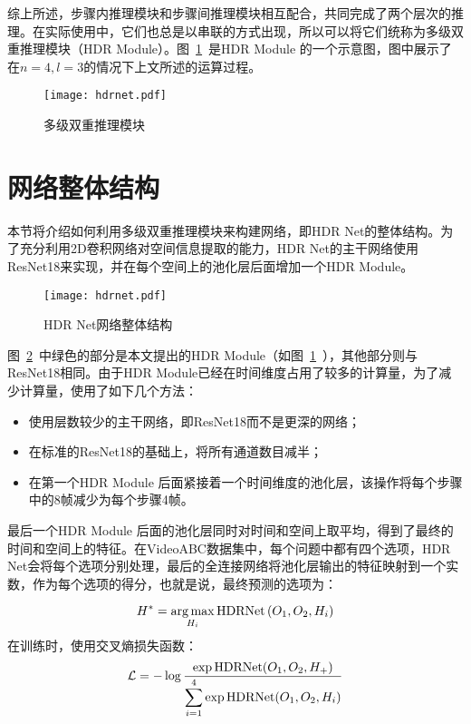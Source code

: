 综上所述，步骤内推理模块和步骤间推理模块相互配合，共同完成了两个层次的推理。在实际使用中，它们也总是以串联的方式出现，所以可以将它们统称为多级双重推理模块（HDR Module）。图~\ref{fig:HDR_Module}~是HDR Module 的一个示意图，图中展示了在$n=4,l=3$的情况下上文所述的运算过程。
\begin{figure}[htbp]
    \centering
    \texttt{[image: hdrnet.pdf]}
    \caption{多级双重推理模块}
    \label{fig:HDR_Module}
\end{figure}
\section{网络整体结构}\label{sec:whole}
本节将介绍如何利用多级双重推理模块来构建网络，即HDR Net的整体结构。为了充分利用2D卷积网络对空间信息提取的能力，HDR Net的主干网络使用ResNet18\cite{he2016deep}来实现，并在每个空间上的池化层后面增加一个HDR Module。

\begin{figure}[htbp]
    \centering
    \texttt{[image: hdrnet.pdf]}
    \caption{HDR Net网络整体结构}
    \label{fig:hdrnet}
\end{figure}
图~\ref{fig:hdrnet}~中绿色的部分是本文提出的HDR Module（如图~\ref{fig:HDR_Module}~），其他部分则与ResNet18相同。由于HDR Module已经在时间维度占用了较多的计算量，为了减少计算量，使用了如下几个方法：
\begin{itemize}
    \item 使用层数较少的主干网络，即ResNet18而不是更深的网络；
    \item 在标准的ResNet18的基础上，将所有通道数目减半；
    \item 在第一个HDR Module 后面紧接着一个时间维度的池化层，该操作将每个步骤中的8帧减少为每个步骤4帧。
\end{itemize}

最后一个HDR Module 后面的池化层同时对时间和空间上取平均，得到了最终的时间和空间上的特征。在VideoABC数据集中，每个问题中都有四个选项，HDR Net会将每个选项分别处理，最后的全连接网络将池化层输出的特征映射到一个实数，作为每个选项的得分，也就是说，最终预测的选项为：

\begin{equation}
    H^* = \operatorname*{arg\,max}_{H_i} \operatorname{HDRNet}\left(O_1, O_2, H_i\right)
\end{equation}
在训练时，使用交叉熵损失函数：
\begin{equation}
    {\mathcal{L}} = -\log\frac{\exp{\operatorname{HDRNet}(O_1, O_2, H_+)}}{\displaystyle\sum_{i=1}^4\exp{\operatorname{HDRNet}(O_1, O_2, H_i)}}
\end{equation}

